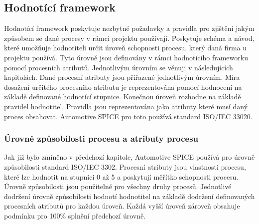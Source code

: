 \documentclass[czech,master,public,dept460,male,cpdeclaration,oneside]{diploma}
\begin{document}
\subsection{Hodnotící framework}
Hodnotící framework poskytuje nezbytné požadavky a pravidla pro zjištění jakým způsobem se dané procesy v rámci projektu používají. Poskytuje schéma a návod, které umožňuje hodnotiteli určit úroveň schopnosti procesu, který daná firma u projektu používá. Tyto úrovně jsou definovány v rámci hodnotícího frameworku pomocí procesních atributů. Jednotlivým úrovním se věnuji v následujících kapitolách. Dané procesní atributy jsou přiřazené jednotlivým úrovním. Míra dosažení určitého procesního atributu je reprezentována pomocí hodnocení na základě definované hodnotící stupnice. Konečnou úroveň rozhodne na základě pravidel hodnotitel. Pravidla jsou reprezentována jako atributy které musí daný proces obsahovat. Automotive SPICE pro toto používá standard ISO/IEC 33020. \cite{ref:aspice_download_1523}

\subsubsection{Úrovně způsobilosti procesu a atributy procesu}
Jak již bylo zmíněno v předchozí kapitole, Automotive SPICE používá pro úrovně způsobilosti standard ISO/IEC 3302. Procesní atributy jsou vlastnosti procesu, které lze hodnotit na stupnici 0 až 5 a poskytují měřítko schopnosti procesu. Úrovně způsobilosti jsou použitelné pro všechny druhy procesů. Jednotlivé dodržení úrovně způsobilosti hodnotí hodnotitel na základě dodržení definovaných procesních atributů pro každou úroveň. Každá vyšší úroveň zároveň obsahuje podmínku pro 100\% splnění předchozí úrovně.
\end{document}

